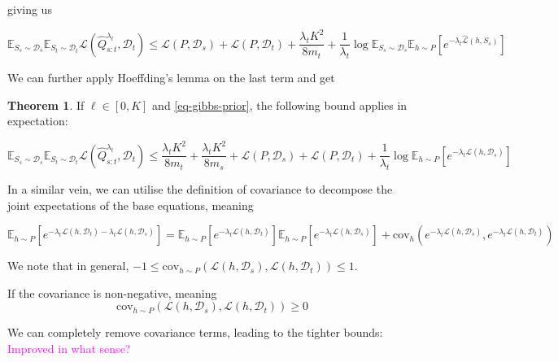 \documentclass[letterpaper]{article}
\theoremstyle{definition}
\newtheorem{theorem}{Theorem}
\newcommand{\RM}[1]{{\textcolor{magenta}{#1}}}
\begin{document}
giving us 

\begin{equation*} 
\mathbb{E}_{S_s\sim \mathcal{D}_s}\mathbb{E}_{S_t\sim \mathcal{D}_t}\mathcal{L}( \hat{Q}^{\lambda_t}_{s:t},\mathcal{D}_t)\leq \mathcal{L}(P,\mathcal{D}_s)+\mathcal{L}(P,\mathcal{D}_t)+\frac{\lambda_t K^2}{8m_t}+\frac{1}{\lambda_t}\log\mathbb{E}_{S_s\sim \mathcal{D}_s}\mathbb{E}_{h\sim P}\left [e^{-\lambda_t\hat{\mathcal{L}}(h,S_s)} \right ]
\end{equation*}

We can further apply Hoeffding's lemma on the last term and get

\begin{theorem}
If $\ell\in[0,K]$ and \eqref{eq-gibbs-prior}, the following bound applies in expectation:

\begin{equation} 
\mathbb{E}_{S_s\sim \mathcal{D}_s}\mathbb{E}_{S_t\sim \mathcal{D}_t}\mathcal{L}( \hat{Q}^{\lambda_t}_{s:t},\mathcal{D}_t)\leq \frac{\lambda_t K^2}{8m_t}+\frac{\lambda_t K^2}{8m_s}+\mathcal{L}(P,\mathcal{D}_s)+\mathcal{L}(P,\mathcal{D}_t) +\frac{1}{\lambda_t}\log\mathbb{E}_{h\sim P}\left [e^{-\lambda_t\mathcal{L}(h,\mathcal{D}_s)} \right ]
\end{equation}
\end{theorem}

In a similar vein, we can utilise the definition of covariance to decompose the joint expectations of the base equations, meaning 

$$\mathbb{E}_{h\sim P}\left [e^{-\lambda_t\mathcal{L}(h,\mathcal{D}_t)-\lambda_t\mathcal{L}(h,\mathcal{D}_s)}\right ]=\mathbb{E}_{h\sim P}\left [e^{-\lambda_t\mathcal{L}(h,\mathcal{D}_t)}\right ] \mathbb{E}_{h\sim P}\left [e^{-\lambda_t\mathcal{L}(h,\mathcal{D}_s)}\right ]+\mathrm{cov}_{h}\left (e^{-\lambda_t\mathcal{L}(h,\mathcal{D}_s)}, e^{-\lambda_t\mathcal{L}(h,\mathcal{D}_t)}\right )$$

We note that in general, $-1\leq \mathrm{cov}_{h\sim P}\left (\mathcal{L}(h,\mathcal{D}_s), \mathcal{L}(h,\mathcal{D}_t)\right ) \leq 1$.

If the covariance is non-negative, meaning $$\mathrm{cov}_{h\sim P}\left (\mathcal{L}(h,\mathcal{D}_s), \mathcal{L}(h,\mathcal{D}_t)\right )\geq 0$$

We can completely remove covariance terms, leading to the tighter bounds: \RM{Improved in what sense?}
\end{document}
